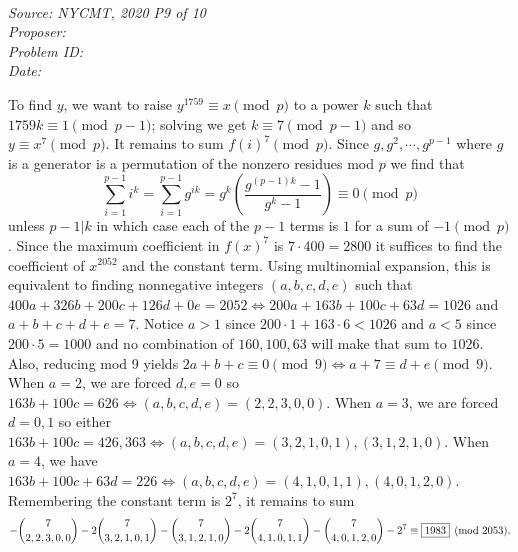 \SSbreak\\
\emph{Source: NYCMT, 2020 P9 of 10}\\
\emph{Proposer: \Pnjoy}\\
\emph{Problem ID: }\\
\emph{Date: }\\
\SSbreak

\bigskip

\begin{solution}\hfil\medskip

    To find $y$, we want to raise $y^{1759} \equiv x \pmod{p}$ to a power $k$ such that $1759k \equiv 1 \pmod{p - 1}$; solving we get $k \equiv 7 \pmod{p - 1}$
    and so $y \equiv x^7 \pmod{p}$. It remains to sum $f(i)^7 \pmod{p}$. Since $g, g^2, \cdots , g^{p - 1}$ where $g$ is a generator is a permutation of the nonzero residues mod $p$
    we find that $$\sum_{i = 1}^{p - 1} i^k = \sum_{i = 1}^{p - 1} g^{ik} = g^k \left(\dfrac{g^{(p - 1)k} - 1}{g^k - 1}\right) \equiv 0 \pmod{p}$$ unless $p - 1 | k$
    in which case each of the $p - 1$ terms is $1$ for a sum of $-1 \pmod{p}$. Since the maximum coefficient in $f(x)^7$ is $7 \cdot 400 = 2800$ it suffices to
    find the coefficient of $x^{2052}$ and the constant term. Using multinomial expansion, this is equivalent to finding nonnegative integers $(a, b, c, d, e)$ 
    such that $400a + 326b + 200c + 126d + 0e = 2052 \iff 200a + 163b + 100c + 63d = 1026$ and $a + b + c + d + e = 7$. Notice $a > 1$ since $200 \cdot 1 + 163 \cdot 6 < 1026$ and 
    $a < 5$ since $200 \cdot 5 = 1000$ and no combination of $160, 100, 63$ will make that sum to $1026$. Also, reducing mod 9 yields $2a + b + c \equiv 0 \pmod{9} \iff a + 7 \equiv d + e \pmod{9}.$
    When $a = 2$, we are forced $d, e = 0$ so $163b + 100c = 626 \iff (a, b, c, d, e) = (2, 2, 3, 0, 0)$.
    When $a = 3$, we are forced $d = 0, 1$ so either $163b + 100c = 426, 363 \iff (a, b, c, d, e) = (3, 2, 1, 0, 1), (3, 1, 2, 1, 0)$.
    When $a = 4$, we have $163b + 100c + 63d = 226 \iff (a, b, c, d, e) = (4, 1, 0, 1, 1), (4, 0, 1, 2, 0)$.
    Remembering the constant term is $2^7$, it remains to sum 
    $$-\dbinom{7}{2, 2, 3, 0, 0} - 2\dbinom{7}{3, 2, 1, 0, 1} - \dbinom{7}{3, 1, 2, 1, 0} - 2\dbinom{7}{4, 1, 0, 1, 1} - \dbinom{7}{4, 0, 1, 2, 0} - 2^7 \equiv \boxed{1983} \pmod{2053}.$$
\end{solution}\bigskip
